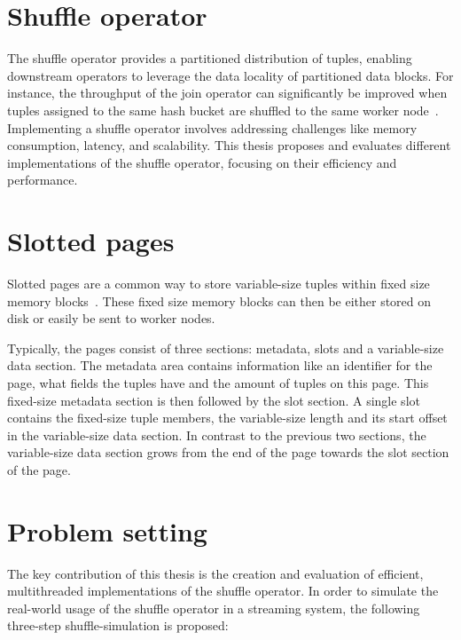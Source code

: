 \section{Shuffle operator}
The shuffle operator provides a partitioned distribution of tuples, enabling downstream operators to leverage the data locality of partitioned data blocks.
For instance, the throughput of the join operator can significantly be improved when tuples assigned to the same hash bucket are shuffled to the same worker node~\parencite{join-processing-in-parallel-db}.
Implementing a shuffle operator involves addressing challenges like memory consumption, latency, and scalability.
This thesis proposes and evaluates different implementations of the shuffle operator, focusing on their efficiency and performance.

\section{Slotted pages}
Slotted pages are a common way to store variable-size tuples within fixed size memory blocks~\parencite{Data-page-layouts-for-relational-databases}.
These fixed size memory blocks can then be either stored on disk or easily be sent to worker nodes.

Typically, the pages consist of three sections: metadata, slots and a variable-size data section.
The metadata area contains information like an identifier for the page, what fields the tuples have and the amount of tuples on this page.
This fixed-size metadata section is then followed by the slot section.
A single slot contains the fixed-size tuple members, the variable-size length and its start offset in the variable-size data section.
In contrast to the previous two sections, the variable-size data section grows from the end of the page towards the slot section of the page.

\section{Problem setting}
The key contribution of this thesis is the creation and evaluation of efficient, multithreaded implementations of the shuffle operator.
In order to simulate the real-world usage of the shuffle operator in a streaming system, the following three-step shuffle-simulation is proposed:


